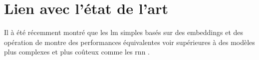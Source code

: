 \section{Lien avec l'état de l'art}
Il à été récemment montré que les \gls{lm} simples basés sur des  \glspl{embedding} et des opération de 
montre des performances équivalentes voir supérieures à des modèles plus complexes et plus coûteux comme les \gls{rnn} \autocite{pooling_simple}.

%
%
%
%
%
